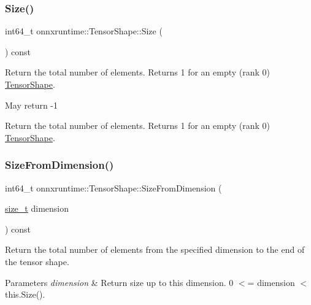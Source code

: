 \subsubsection{\texorpdfstring{Size()}{Size()}}
{\footnotesize\ttfamily int64\+\_\+t onnxruntime\+::\+Tensor\+Shape\+::\+Size (\begin{DoxyParamCaption}{ }\end{DoxyParamCaption}) const}

Return the total number of elements. Returns 1 for an empty (rank 0) \mbox{\hyperlink{classonnxruntime_1_1TensorShape}{Tensor\+Shape}}.

May return -\/1

Return the total number of elements. Returns 1 for an empty (rank 0) \mbox{\hyperlink{classonnxruntime_1_1TensorShape}{Tensor\+Shape}}. \mbox{\label{classonnxruntime_1_1TensorShape_a4a084e4fe8348af11cf8cf1d22c4800d}} 
\subsubsection{\texorpdfstring{Size\+From\+Dimension()}{SizeFromDimension()}}
{\footnotesize\ttfamily int64\+\_\+t onnxruntime\+::\+Tensor\+Shape\+::\+Size\+From\+Dimension (\begin{DoxyParamCaption}\item[{\mbox{\hyperlink{mlasi_8h_a503efbc1c6e50825320ad909366b78ab}{size\+\_\+t}}}]{dimension }\end{DoxyParamCaption}) const}

Return the total number of elements from the specified dimension to the end of the tensor shape. 
\begin{DoxyParams}{Parameters}
{\em dimension} & Return size up to this dimension. 0 $<$= dimension $<$ this.\+Size(). \\
\hline
\end{DoxyParams}
\mbox{\label{classonnxruntime_1_1TensorShape_a85c717aa5d4607765c55a461a5b6f754}} 
